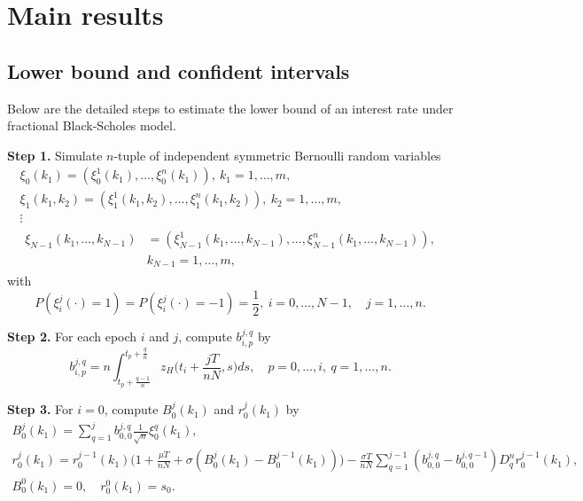 \documentclass[reqno]{amsart}
\begin{document}
\section{Main results}
\label{sec:main}

\subsection{Lower bound and confident intervals}
Below are the detailed steps to estimate the lower bound of an interest rate under 
fractional Black-Scholes model.
\smallskip

\noindent\textbf{Step 1.} Simulate $n$-tuple of independent symmetric Bernoulli
 random variables
\begin{gather*}
 \xi_0(k_1)=\left(\xi_0^1(k_1), \dots,
  \xi_0^n(k_1)\right), \ k_1=1,\dots,m,\\
 \xi_1\left(k_1,k_2\right)=\left(\xi_1^1\left(k_1,k_2\right), \dots,
 \xi_1^n\left(k_1,k_2\right)\right), \ k_2=1,\dots,m,\\
 \vdots\\
\begin{aligned}
\xi_{N-1}\left(k_1,\dots,k_{N-1}\right)
&=\left(\xi_{N-1}^1\left(k_1,\dots,k_{N-1}\right), \dots, \xi_{N-1}^n\left(k_1,
\dots,k_{N-1}\right)\right), \\ &k_{N-1}=1,\dots,m,
\end{aligned}
\end{gather*}
with
\[ 
P\left(\xi_i^j\left(\cdot\right)=1\right)
=P\left(\xi_i^j\left(\cdot\right)=-1\right)
=\frac{1}{2},\ i=0,\dots,N-1,\quad  j=1,\dots,n.
\]
\smallskip

\noindent\textbf{Step 2.} For each epoch $i$ and $j$, compute $b_{i,p}^{j,q}$ by
\[
 b_{i,p}^{j,q}=n \int_{t_p+\frac{q-1}{n}}^{t_p+\frac{q}{n}} z_H
  \Big(t_{i}+\frac{jT}{nN}, s\Big) d s,\quad  p=0,\dots,i,\ q=1,\dots,n.
\]
\smallskip

\noindent\textbf{Step 3.} For $i=0$, compute $B_{0}^{j}(k_1)$ and
$r_{0}^{j}(k_1)$ by
\begin{gather*}
 B_{0}^{j}(k_1)
 =\sum_{q=1}^{j} b_{0,0}^{j,q} \frac{1}{\sqrt{n}} \xi_0^q(k_1),\\
 r_{0}^{j}(k_1)
 = r_{0}^{j-1}(k_1)\Big(1+\frac{\mu T}{nN}+\sigma\left(B_{0}^{j}(k_1)-B_{0}^{j-1}(k_1)
 \right)\Big)
 - \frac{\sigma T}{nN} \sum_{q=1}^{j-1}\left(b_{0,0}^{j,q}-b_{0,0}^{j,q-1}\right)
  D_q^n r_{0}^{j-1}(k_1) ,
\\
 B_{0}^{0}(k_1)=0,\quad r_{0}^{0}(k_1)=s_0.
\end{gather*}
\smallskip
\end{document}
